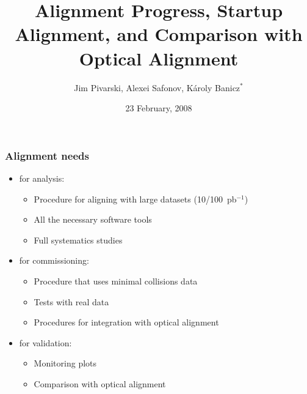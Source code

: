 \documentclass[compress]{beamer}
\title{Alignment Progress, Startup Alignment, and Comparison with Optical Alignment}
\author{Jim Pivarski, Alexei Safonov, K\'aroly Banicz$^*$}
\institute{Texas A\&M University, $^*$FermiLab}
\date{23 February, 2008}
\begin{document}
\frame{\titlepage}


\begin{frame}
\frametitle{Alignment needs}

\begin{itemize}\setlength{\itemsep}{0.4 cm}
\item for analysis:
\begin{itemize}\setlength{\itemsep}{0.1 cm}
\item Procedure for aligning with large datasets (10/100~pb$^{-1}$)
\item All the necessary software tools
\item Full systematics studies
\end{itemize}

\item for commissioning:
\begin{itemize}\setlength{\itemsep}{0.1 cm}
\item Procedure that uses minimal collisions data
\item Tests with real data
\item Procedures for integration with optical alignment
\end{itemize}

\item for validation:
\begin{itemize}\setlength{\itemsep}{0.1 cm}
\item Monitoring plots
\item Comparison with optical alignment
\end{itemize}
\end{itemize}
\end{frame}
\end{document}
